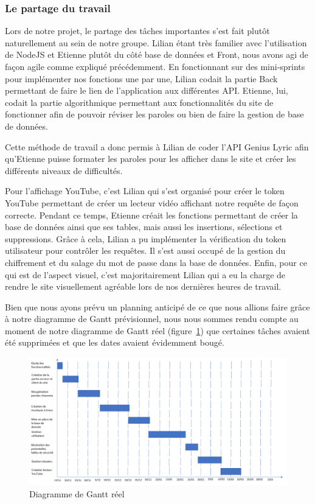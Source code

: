 \documentclass[12pt,french]{article}
\begin{document}
\subsubsection{Le partage du travail} 

Lors de notre projet, le partage des tâches importantes s'est fait plutôt naturellement au sein de notre groupe. Lilian étant très familier avec l'utilisation de NodeJS et Etienne plutôt du côté base de données et \gls{Front}, nous avons agi de façon agile comme expliqué précédemment. En fonctionnant sur des mini-\gls{sprint}s pour implémenter nos fonctions une par une, Lilian codait la partie \gls{Back} permettant de faire le lien de l'application aux différentes \gls{API}. Etienne, lui, codait la partie algorithmique permettant aux fonctionnalités du site de fonctionner afin de pouvoir réviser les paroles ou bien de faire la gestion de base de données.
\newline


Cette méthode de travail a donc permis à Lilian de coder l'\gls{API} Genius Lyric afin qu'Etienne puisse formater les paroles pour les afficher dans le site et créer les différents niveaux de difficultés. 

\newpage

\noindent
Pour l'affichage YouTube, c'est Lilian qui s'est organisé pour créer le \gls{token} YouTube permettant de créer un lecteur vidéo affichant notre requête de façon correcte. Pendant ce temps, Etienne créait les fonctions permettant de créer la base de données ainsi que ses \gls{table}s, mais aussi les insertions, sélections et suppressions. Grâce à cela, Lilian a pu implémenter la vérification du \gls{token} utilisateur pour contrôler les requêtes. Il s'est aussi occupé de la gestion du chiffrement et du salage du mot de passe dans la base de données. Enfin, pour ce qui est de l'aspect visuel, c'est majoritairement Lilian qui a eu la charge de rendre le site visuellement agréable lors de nos dernières heures de travail.
\newline   

Bien que nous ayons prévu un planning anticipé de ce que nous allions faire grâce à notre diagramme de Gantt prévisionnel, nous nous sommes rendu compte au moment de notre diagramme de Gantt réel (figure~\ref{figure9}) que certaines tâches avaient été supprimées et que les dates avaient évidemment bougé.

\begin{figure}[H]
	\centering
	\includegraphics[scale=0.5]{ganttreel.png}
	\caption{Diagramme de Gantt réel}  
	\label{figure9}   
\end{figure}
\end{document}
